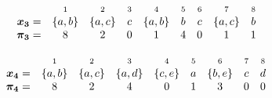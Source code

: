 \documentclass[runningheads,a4paper]{llncs}
\def\s#1{\mbox{\boldmath $#1$}}
\newif\ifRev
\begin{document}
\begin{equation}
\label{piN1}
\begin{array}{rcccccccc}
& \scriptstyle 1 & \scriptstyle 2 & \scriptstyle 3 & \scriptstyle 4 & \scriptstyle 5 & \scriptstyle  6 & \scriptstyle 7 & \scriptstyle 8 \\
\s{x_3} = & \{a,b\} & \{a,c\} & c & \{a,b\} & b & c & \{a,c\} & b \\
\s{\pi_3} = & 8 & 2 & 0 & 1 & 4 & 0 & 1 & 1
\end{array}
\end{equation}

\begin{equation}
\label{piN2}
\begin{array}{rcccccccc}
& \scriptstyle 1 & \scriptstyle 2 & \scriptstyle 3 & \scriptstyle 4 & \scriptstyle 5 & \scriptstyle  6 & \scriptstyle 7 & \scriptstyle 8 \\
\s{x_4} = & \{a,b\} & \{a,c\} & \{a,d\} & \{c,e\} & a & \{b,e\} & c & d \\
\s{\pi_4} = & 8 & 2 & 4 & 0 & 1 & 3 & 0 & 0
\end{array}
\end{equation}


\ifRev
\begin{figure}[htbp]
  \begin{minipage}{0.5\linewidth}
  \centering
  \texttt{[image: ex-2-p]}\\
  \caption{$\mathcal{P}_{\s{y_2}}^+$ for $\s{y_2} = 80420311$}\label{Graph-ex-2-p}
  \end{minipage}
  \hfill
  \begin{minipage}{0.5\linewidth}
  \centering
  \texttt{[image: ex-2-n]}\\
  \caption{$\mathcal{P}_{\s{y_2}}^-$ for $\s{y_2} = 80420311$}\label{Graph-ex-2-n}
  \end{minipage}
\end{figure}
\fi
\end{document}
